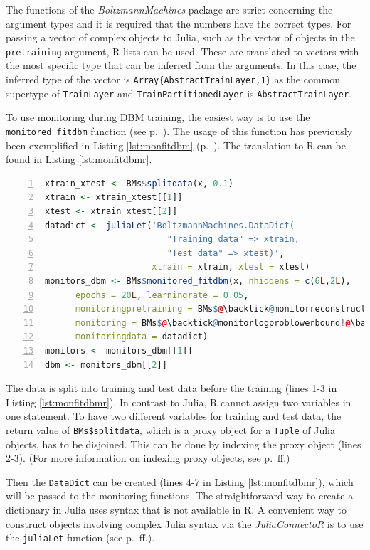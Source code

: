 \documentclass[12pt]{article}
\newcommand{\inlinecode}[1]{\texttt{#1}}
\newcommand{\apkg}[1]{\emph{#1}}
\begin{document}
The functions of the \apkg{BoltzmannMachines} package are strict concerning the argument types and it is required that the numbers have the correct types.
For passing a vector of complex objects to Julia, such as the vector of objects in the \inlinecode{pretraining} argument, R lists can be used.
These are translated to vectors with the most specific type that can be inferred from the arguments.
In this case, the inferred type of the vector is \inlinecode{Array\{AbstractTrainLayer,1\}} as the common supertype of \inlinecode{TrainLayer} and \inlinecode{TrainPartitionedLayer} is \inlinecode{AbstractTrainLayer}.

To use monitoring during DBM training, the easiest way is to use the \inlinecode{monitored\_fitdbm} function (see p.~\pageref{bms_monitored_fitdbm}).
The usage of this function has previously been exemplified in Listing \ref{lst:monfitdbm} (p.~\pageref{lst:monfitdbm}).
The translation to R can be found in Listing \ref{lst:monfitdbmr}.

\begin{lstlisting}[language=R,caption={Monitoring pre-training and fine-tuning}, label={lst:monfitdbmr}, float = !h, numbers=left,style=rlststyle]
xtrain_xtest <- BMs$splitdata(x, 0.1)
xtrain <- xtrain_xtest[[1]]
xtest <- xtrain_xtest[[2]]
datadict <- juliaLet('BoltzmannMachines.DataDict(
                        "Training data" => xtrain,
                        "Test data" => xtest)',
                     xtrain = xtrain, xtest = xtest)
monitors_dbm <- BMs$monitored_fitdbm(x, nhiddens = c(6L,2L),
      epochs = 20L, learningrate = 0.05,
      monitoringpretraining = BMs$@\backtick@monitorreconstructionerror!@\backtick@,
      monitoring = BMs$@\backtick@monitorlogproblowerbound!@\backtick@,
      monitoringdata = datadict)
monitors <- monitors_dbm[[1]]
dbm <- monitors_dbm[[2]]
\end{lstlisting}

The data is split into training and test data before the training (lines 1-3 in Listing \ref{lst:monfitdbmr}).
In contrast to Julia, R cannot assign two variables in one statement.
To have two different variables for training and test data, the return value of \inlinecode{BMs\$splitdata}, which is a proxy object for a \inlinecode{Tuple} of Julia objects, has to be disjoined.
This can be done by indexing the proxy object (lines 2-3).
(For more information on indexing proxy objects, see p.~\pageref{rdokitem_AccessMutate.JuliaProxy}ff.)

Then the \inlinecode{DataDict} can be created (lines 4-7 in Listing \ref{lst:monfitdbmr}), which will be passed to the monitoring functions.
The straightforward way to create a dictionary in Julia uses syntax that is not available in R.
A convenient way to construct objects involving complex Julia syntax via the \apkg{JuliaConnectoR} is to use the \inlinecode{juliaLet} function (see p.~\pageref{rdokitem_juliaLet}ff.).
\end{document}
